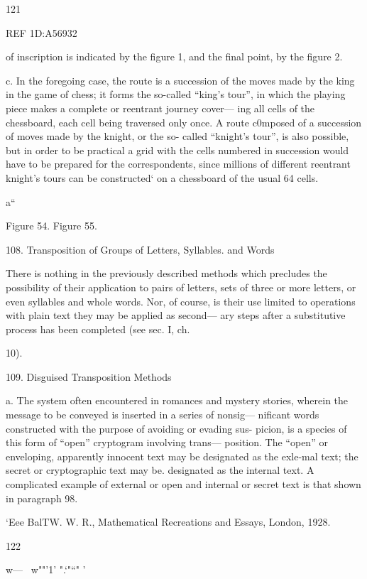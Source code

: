 121

REF 1D:A56932

of inscription is indicated by the ﬁgure 1, and the ﬁnal point, by the
figure 2.

c. In the foregoing case, the route is a succession of the moves made
by the king in the game of chess; it forms the so-called “king’s tour”,
in which the playing piece makes a complete or reentrant journey cover—
ing all cells of the chessboard, each cell being traversed only once. A
route c0mposed of a succession of moves made by the knight, or the so-
called “knight’s tour”, is also possible, but in order to be practical a grid
with the cells numbered in succession would have to be prepared for the
correspondents, since millions of different reentrant knight’s tours can
be constructed‘ on a chessboard of the usual 64 cells.

a“

 

Figure 54. Figure 55.

108. Transposition of Groups of Letters, Syllables. and Words

There is nothing in the previously described methods which precludes
the possibility of their application to pairs of letters, sets of three or
more letters, or even syllables and whole words. Nor, of course, is their
use limited to operations with plain text they may be applied as second—
ary steps after a substitutive process has been completed (see sec. I, ch.

10).

109. Disguised Transposition Methods

a. The system often encountered in romances and mystery stories,
wherein the message to be conveyed is inserted in a series of nonsig—
niﬁcant words constructed with the purpose of avoiding or evading sus-
picion, is a species of this form of “open” cryptogram involving trans—
position. The “open” or enveloping, apparently innocent text may be
designated as the exle-mal text; the secret or cryptographic text may be.
designated as the internal text. A complicated example of external or
open and internal or secret text is that shown in paragraph 98.

‘Eee BalTW. W. R., Mathematical Recreations and Essays, London, 1928.

122

 

 

w—~ w""'1' ".‘"“" '

 

